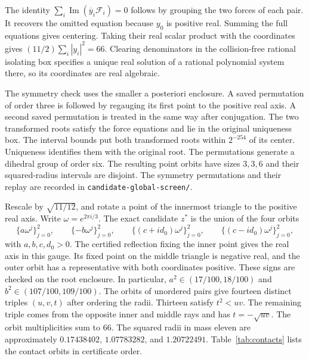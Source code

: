 \documentclass[11pt,letterpaper]{article}
\theoremstyle{remark}
\begin{document}
The identity $\sum_i\operatorname{Im}(\overline y_i\mathcal F_i)=0$ follows by grouping the two forces of each pair. It recovers the omitted equation because $y_0$ is positive real. Summing the full equations gives centering. Taking their real scalar product with the coordinates gives $(11/2)\sum_i |y_i|^2=66$. Clearing denominators in the collision-free rational isolating box specifies a unique real solution of a rational polynomial system there, so its coordinates are real algebraic.

The symmetry check uses the smaller a posteriori enclosure. A saved permutation of order three is followed by regauging its first point to the positive real axis. A second saved permutation is treated in the same way after conjugation. The two transformed roots satisfy the force equations and lie in the original uniqueness box. The interval bounds put both transformed roots within $2^{-254}$ of its center. Uniqueness identifies them with the original root. The permutations generate a dihedral group of order six. The resulting point orbits have sizes $3,3,6$ and their squared-radius intervals are disjoint. The symmetry permutations and their replay are recorded in \texttt{candidate-global-screen/}.

Rescale by $\sqrt{11/12}$, and rotate a point of the innermost triangle to the positive real axis. Write $\omega=e^{2\pi i/3}$. The exact candidate $z^*$ is the union of the four orbits
\begin{equation}
 \{a\omega^j\}_{j=0}^2,\qquad
 \{-b\omega^j\}_{j=0}^2,\qquad
 \{(c+i d_0)\omega^j\}_{j=0}^2,\qquad
 \{(c-i d_0)\omega^j\}_{j=0}^2,
 \label{eq:n12-candidate-shape}
\end{equation}
with $a,b,c,d_0>0$. The certified reflection fixing the inner point gives the real axis in this gauge. Its fixed point on the middle triangle is negative real, and the outer orbit has a representative with both coordinates positive. These signs are checked on the root enclosure. In particular, $a^2\in(17/100,18/100)$ and $b^2\in(107/100,109/100)$. The orbits of unordered pairs give fourteen distinct triples $(u,v,t)$ after ordering the radii. Thirteen satisfy $t^2<uv$. The remaining triple comes from the opposite inner and middle rays and has $t=-\sqrt{uv}$. The orbit multiplicities sum to $66$. The squared radii in mass
eleven are approximately \(0.17438402\), \(1.07783282\), and \(1.20722491\).
Table~\ref{tab:contacts} lists the contact orbits in certificate order.
\end{document}
